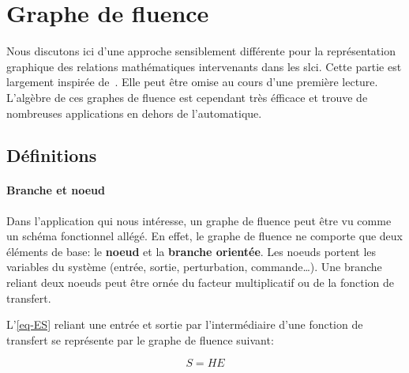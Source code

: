 \section{Graphe de fluence}
Nous discutons ici d'une approche sensiblement différente 
pour la représentation graphique des relations mathématiques 
intervenants dans les \gls{slci}. Cette partie est largement
inspirée de~\cite{Ostertag}. Elle peut être omise au cours 
d'une première lecture. L'algèbre de ces graphes de fluence
est cependant très éfficace et trouve de nombreuses applications 
en dehors de l'automatique. 

\subsection{Définitions}

\paragraph{Branche et noeud}

Dans l'application qui nous intéresse, un graphe de fluence 
peut être vu comme un schéma fonctionnel allégé. En effet, le graphe de fluence 
ne comporte que deux éléments de base: le \textbf{noeud} et la \textbf{branche orientée}. 
Les noeuds portent les variables du système (entrée, sortie, perturbation, commande\ldots). 
Une branche reliant deux noeuds peut être ornée du facteur multiplicatif ou 
de la fonction de transfert.

L'\cref{eq-ES} reliant une entrée et sortie par l'intermédiaire d'une fonction de transfert se 
représente par le graphe de fluence suivant:

\begin{center}
$$
S=HE
$$
\end{center}


